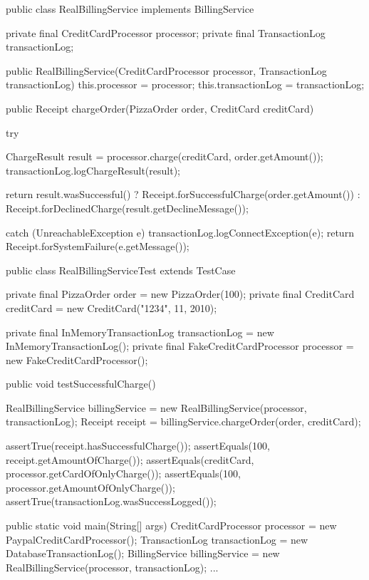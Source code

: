 \begin{Java}[服务的具体实现不再负责对象的依赖]
public class RealBillingService implements BillingService {
  private final CreditCardProcessor processor;
  private final TransactionLog transactionLog;

  public RealBillingService(CreditCardProcessor processor, 
      TransactionLog transactionLog) {
    this.processor = processor;
    this.transactionLog = transactionLog;
  }

  public Receipt chargeOrder(PizzaOrder order, CreditCard creditCard) {
    try {
      ChargeResult result = processor.charge(creditCard, order.getAmount());
      transactionLog.logChargeResult(result);

      return result.wasSuccessful()
          ? Receipt.forSuccessfulCharge(order.getAmount())
          : Receipt.forDeclinedCharge(result.getDeclineMessage());
     } catch (UnreachableException e) {
      transactionLog.logConnectException(e);
      return Receipt.forSystemFailure(e.getMessage());
    }
  }
}
\end{Java}

\begin{Java}[我们不再需要工厂了]
public class RealBillingServiceTest extends TestCase {

  private final PizzaOrder order = new PizzaOrder(100);
  private final CreditCard creditCard = new CreditCard("1234", 11, 2010);

  private final InMemoryTransactionLog transactionLog = new InMemoryTransactionLog();
  private final FakeCreditCardProcessor processor = new FakeCreditCardProcessor();

  public void testSuccessfulCharge() {
    RealBillingService billingService
        = new RealBillingService(processor, transactionLog);
    Receipt receipt = billingService.chargeOrder(order, creditCard);

    assertTrue(receipt.hasSuccessfulCharge());
    assertEquals(100, receipt.getAmountOfCharge());
    assertEquals(creditCard, processor.getCardOfOnlyCharge());
    assertEquals(100, processor.getAmountOfOnlyCharge());
    assertTrue(transactionLog.wasSuccessLogged());
  }
}
\end{Java}

\begin{Java}
  public static void main(String[] args) {
    CreditCardProcessor processor = new PaypalCreditCardProcessor();
    TransactionLog transactionLog = new DatabaseTransactionLog();
    BillingService billingService
        = new RealBillingService(processor, transactionLog);
    ...
  }
\end{Java}

